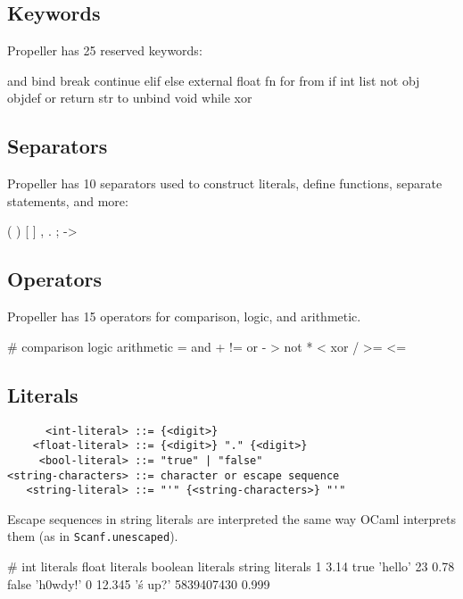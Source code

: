 \subsection{Keywords}
Propeller has 25 reserved keywords:
\begin{mylistingn}
and  bind     break continue elif
else external float fn       for
from if       int   list     not
obj  objdef   or    return   str
to   unbind   void  while    xor                     
\end{mylistingn}

\subsection{Separators}
Propeller has 10 separators used to construct literals, define functions, separate statements, and
more:
\begin{mylistingn}
( ) [ ] { }
, . ;   ->
\end{mylistingn}

\clearpage

\subsection{Operators}
Propeller has 15 operators for comparison, logic, and arithmetic.
\begin{mylistingn}
# comparison  logic  arithmetic
  =           and    +
  !=          or     -
  >           not    *
  <           xor    /
  >=                 %
  <=
\end{mylistingn}

\subsection{Literals}
\begin{verbatim}
      <int-literal> ::= {<digit>}
    <float-literal> ::= {<digit>} "." {<digit>}
     <bool-literal> ::= "true" | "false"
<string-characters> ::= character or escape sequence
   <string-literal> ::= "'" {<string-characters>} "'"
\end{verbatim}

\noindent Escape sequences in string literals are interpreted the same way OCaml
interprets them (as in \verb|Scanf.unescaped|).

\begin{mylistingn}
# int literals     float literals     boolean literals       string literals
1                  3.14               true                   'hello'
23                 0.78               false                  'h0wdy!'
0                  12.345                                    '\twhat\'s up?\n'
5839407430         0.999
\end{mylistingn}

